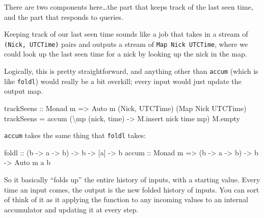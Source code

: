 \documentclass[]{article}
\newenvironment{Shaded}{}{}
\newcommand{\DataTypeTok}[1]{\textcolor[rgb]{0.56,0.13,0.00}{#1}}
\newcommand{\FunctionTok}[1]{\textcolor[rgb]{0.02,0.16,0.49}{#1}}
\newcommand{\NormalTok}[1]{#1}
\newcommand{\OtherTok}[1]{\textcolor[rgb]{0.00,0.44,0.13}{#1}}
\begin{document}
There are two components here\ldots the part that keeps track of the last seen
time, and the part that responds to queries.

Keeping track of our last seen time sounds like a job that takes in a stream of
\texttt{(Nick,\ UTCTime)} pairs and outputs a stream of
\texttt{Map\ Nick\ UTCTime}, where we could look up the last seen time for a
nick by looking up the nick in the map.

Logically, this is pretty straightforward, and anything other than
\texttt{accum} (which is like \texttt{foldl\textquotesingle{}}) would really be
a bit overkill; every input would just update the output map.

\begin{Shaded}
\begin{Highlighting}[]
\OtherTok{trackSeens ::} \DataTypeTok{Monad}\NormalTok{ m }\OtherTok{=\textgreater{}} \DataTypeTok{Auto}\NormalTok{ m (}\DataTypeTok{Nick}\NormalTok{, }\DataTypeTok{UTCTime}\NormalTok{) (}\DataTypeTok{Map} \DataTypeTok{Nick} \DataTypeTok{UTCTime}\NormalTok{)}
\NormalTok{trackSeens }\OtherTok{=}\NormalTok{ accum (\textbackslash{}mp (nick, time) }\OtherTok{{-}\textgreater{}}\NormalTok{ M.insert nick time mp) M.empty}
\end{Highlighting}
\end{Shaded}

\texttt{accum} takes the same thing that \texttt{foldl} takes:

\begin{Shaded}
\begin{Highlighting}[]
\FunctionTok{foldl}\OtherTok{ ::}\NormalTok{            (b }\OtherTok{{-}\textgreater{}}\NormalTok{ a }\OtherTok{{-}\textgreater{}}\NormalTok{ b) }\OtherTok{{-}\textgreater{}}\NormalTok{ b }\OtherTok{{-}\textgreater{}}\NormalTok{ [a] }\OtherTok{{-}\textgreater{}}\NormalTok{ b}
\OtherTok{accum ::} \DataTypeTok{Monad}\NormalTok{ m }\OtherTok{=\textgreater{}}\NormalTok{ (b }\OtherTok{{-}\textgreater{}}\NormalTok{ a }\OtherTok{{-}\textgreater{}}\NormalTok{ b) }\OtherTok{{-}\textgreater{}}\NormalTok{ b }\OtherTok{{-}\textgreater{}} \DataTypeTok{Auto}\NormalTok{ m a b}
\end{Highlighting}
\end{Shaded}

So it basically ``folds up'' the entire history of inputs, with a starting
value. Every time an input comes, the output is the new folded history of
inputs. You can sort of think of it as it applying the function to any incoming
values to an internal accumulator and updating it at every step.
\end{document}
